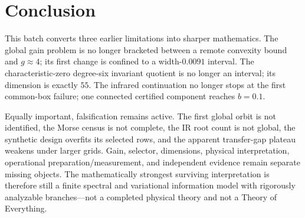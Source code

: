 \documentclass[11pt,a4paper]{article}
\begin{document}
\section{Conclusion}

This batch converts three earlier limitations into sharper mathematics.  The
global gain problem is no longer bracketed between a remote convexity bound
and $g\approx4$; its first change is confined to a width-$0.0091$ interval.
The characteristic-zero degree-six invariant quotient is no longer an
interval; its dimension is exactly $55$.  The infrared continuation no longer
stops at the first common-box failure; one connected certified component
reaches $b=0.1$.

Equally important, falsification remains active.  The first global orbit is
not identified, the Morse census is not complete, the IR root count is not
global, the synthetic design overfits its selected rows, and the apparent
transfer-gap plateau weakens under larger grids.  Gain, selector, dimensions,
physical interpretation, operational preparation/measurement, and independent
evidence remain separate missing objects.  The mathematically strongest
surviving interpretation is therefore still a finite spectral and variational
information model with rigorously analyzable branches---not a completed
physical theory and not a Theory of Everything.
\end{document}
